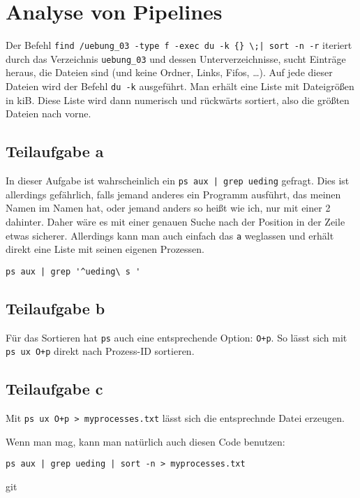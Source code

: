 \documentclass[12pt]{report}
\begin{document}



\section{Analyse von Pipelines}

Der Befehl \verb#find /uebung_03 -type f -exec du -k {} \;| sort -n -r# iteriert durch das Verzeichnis \verb#uebung_03# und dessen Unterverzeichnisse, sucht Einträge heraus, die Dateien sind (und keine Ordner, Links, Fifos, …). Auf jede dieser Dateien wird der Befehl \texttt{du -k} ausgeführt. Man erhält eine Liste mit Dateigrößen in kiB. Diese Liste wird dann numerisch und rückwärts sortiert, also die größten Dateien nach vorne.

\subsection{Teilaufgabe a}
In dieser Aufgabe ist wahrscheinlich ein \verb#ps aux | grep ueding# gefragt. Dies ist allerdings gefährlich, falls jemand anderes ein Programm ausführt, das meinen Namen im Namen hat, oder jemand anders so heißt wie ich, nur mit einer 2 dahinter. Daher wäre es mit einer genauen Suche nach der Position in der Zeile etwas sicherer. Allerdings kann man auch einfach das \texttt{a} weglassen und erhält direkt eine Liste mit seinen eigenen Prozessen.

\begin{lstlisting}[caption=Einschänkung des Suchbereichs]
ps aux | grep '^ueding\ s '
\end{lstlisting}

\subsection{Teilaufgabe b}
Für das Sortieren hat \texttt{ps} auch eine entsprechende Option: \texttt{O+p}. So lässt sich mit \texttt{ps ux O+p} direkt nach Prozess-ID sortieren.

\subsection{Teilaufgabe c}
Mit \verb#ps ux O+p > myprocesses.txt# lässt sich die entsprechnde Datei erzeugen.  


Wenn man mag, kann man natürlich auch diesen Code benutzen:
\begin{lstlisting}[caption=verkettete Pipes]
ps aux | grep ueding | sort -n > myprocesses.txt
\end{lstlisting}git
\end{document}
